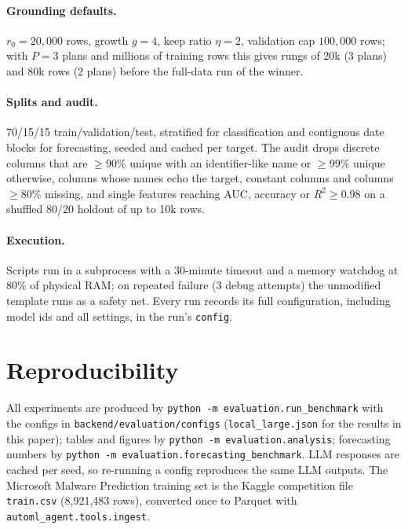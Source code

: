 \paragraph{Grounding defaults.} $r_0 = 20{,}000$ rows, growth $g = 4$, keep ratio $\eta = 2$, validation cap $100{,}000$ rows; with $P = 3$ plans and millions of training rows this gives rungs of 20k (3 plans) and 80k rows (2 plans) before the full-data run of the winner.

\paragraph{Splits and audit.} 70/15/15 train/validation/test, stratified for classification and contiguous date blocks for forecasting, seeded and cached per target. The audit drops discrete columns that are $\ge 90\%$ unique with an identifier-like name or $\ge 99\%$ unique otherwise, columns whose names echo the target, constant columns and columns $\ge 80\%$ missing, and single features reaching AUC, accuracy or $R^2 \ge 0.98$ on a shuffled 80/20 holdout of up to 10k rows.

\paragraph{Execution.} Scripts run in a subprocess with a 30-minute timeout and a memory watchdog at 80\% of physical RAM; on repeated failure (3 debug attempts) the unmodified template runs as a safety net. Every run records its full configuration, including model ids and all settings, in the run's \texttt{config}.

\section{Reproducibility}
\label{app:reproducibility}

All experiments are produced by \texttt{python -m evaluation.run\_benchmark} with the configs in \texttt{backend/evaluation/configs} (\texttt{local\_large.json} for the results in this paper); tables and figures by \texttt{python -m evaluation.analysis}; forecasting numbers by \texttt{python -m evaluation.forecasting\_benchmark}. LLM responses are cached per seed, so re-running a config reproduces the same LLM outputs. The Microsoft Malware Prediction training set is the Kaggle competition file \texttt{train.csv} (8{,}921{,}483 rows), converted once to Parquet with \texttt{automl\_agent.tools.ingest}.

